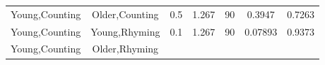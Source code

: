 \documentclass[]{article}
\theoremstyle{definition}
\theoremstyle{definition}
\theoremstyle{definition}
\theoremstyle{remark}
\begin{document}
\begin{longtable}[]{@{}ccccccc@{}}
\begin{minipage}[t]{0.16\columnwidth}
Young,Counting\strut
\end{minipage} & \begin{minipage}[t]{0.16\columnwidth}\centering\strut
Older,Counting\strut
\end{minipage} & \begin{minipage}[t]{0.10\columnwidth}\centering\strut
0.5\strut
\end{minipage} & \begin{minipage}[t]{0.11\columnwidth}\centering\strut
1.267\strut
\end{minipage} & \begin{minipage}[t]{0.05\columnwidth}\centering\strut
90\strut
\end{minipage} & \begin{minipage}[t]{0.11\columnwidth}\centering\strut
0.3947\strut
\end{minipage} & \begin{minipage}[t]{0.11\columnwidth}\centering\strut
0.7263\strut
\end{minipage}\tabularnewline
\begin{minipage}[t]{0.16\columnwidth}\centering\strut
Young,Counting\strut
\end{minipage} & \begin{minipage}[t]{0.16\columnwidth}\centering\strut
Young,Rhyming\strut
\end{minipage} & \begin{minipage}[t]{0.10\columnwidth}\centering\strut
0.1\strut
\end{minipage} & \begin{minipage}[t]{0.11\columnwidth}\centering\strut
1.267\strut
\end{minipage} & \begin{minipage}[t]{0.05\columnwidth}\centering\strut
90\strut
\end{minipage} & \begin{minipage}[t]{0.11\columnwidth}\centering\strut
0.07893\strut
\end{minipage} & \begin{minipage}[t]{0.11\columnwidth}\centering\strut
0.9373\strut
\end{minipage}\tabularnewline
\begin{minipage}[t]{0.16\columnwidth}\centering\strut
Young,Counting\strut
\end{minipage} & \begin{minipage}[t]{0.16\columnwidth}\centering\strut
Older,Rhyming\strut
\end{minipage} & \begin{minipage}[t]{0.10\columnwidth}\centering\strut

\end{minipage}
\end{longtable}
\end{document}
